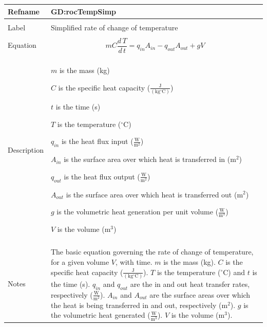 \documentclass[12pt]{article}
\begin{document}
\noindent \begin{minipage}{\textwidth}
\begin{tabular}{p{} p{}}
\toprule \textbf{Refname} & \textbf{GD:rocTempSimp}
\label{GD:rocTempSimp}
\\ \midrule \\
Label & Simplified rate of change of temperature
\\ \midrule \\
Equation & \begin{displaymath}
           m C \frac{d\,T}{d\,t}={q_{in}} {A_{in}}-{q_{out}} {A_{out}}+g V
           \end{displaymath}
\\ \midrule \\
Description & \begin{symbDescription}
              \item{$m$ is the mass (kg)}
              \item{$C$ is the specific heat capacity ($\frac{\text{J}}{(\text{kg}{}^{\circ}\text{C})}$)}
              \item{$t$ is the time (s)}
              \item{$T$ is the temperature (${}^{\circ}$C)}
              \item{${q_{in}}$ is the heat flux input ($\frac{\text{W}}{\text{m}^{2}}$)}
              \item{${A_{in}}$ is the surface area over which heat is transferred in ($\text{m}^{2}$)}
              \item{${q_{out}}$ is the heat flux output ($\frac{\text{W}}{\text{m}^{2}}$)}
              \item{${A_{out}}$ is the surface area over which heat is transferred out ($\text{m}^{2}$)}
              \item{$g$ is the volumetric heat generation per unit volume ($\frac{\text{W}}{\text{m}^{3}}$)}
              \item{$V$ is the volume ($\text{m}^{3}$)}
              \end{symbDescription}
\\ \midrule \\
Notes & The basic equation governing the rate of change of temperature, for a given volume $V$, with time. $m$ is the mass (kg). $C$ is the specific heat capacity ($\frac{\text{J}}{(\text{kg}{}^{\circ}\text{C})}$). $T$ is the temperature (${}^{\circ}$C) and $t$ is the time (s). ${q_{in}}$ and ${q_{out}}$ are the in and out heat transfer rates, respectively ($\frac{\text{W}}{\text{m}^{2}}$). ${A_{in}}$ and ${A_{out}}$ are the surface areas over which the heat is being transferred in and out, respectively ($\text{m}^{2}$). $g$ is the volumetric heat generated ($\frac{\text{W}}{\text{m}^{3}}$). $V$ is the volume ($\text{m}^{3}$).

\end{tabular}
\end{minipage}
\end{document}
